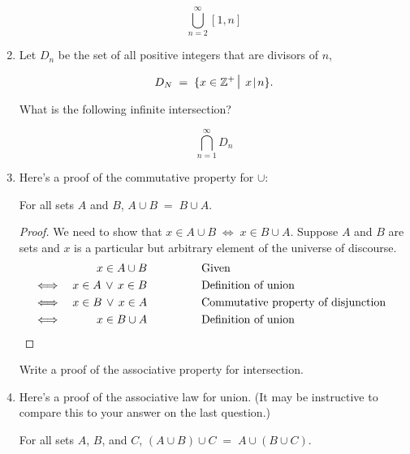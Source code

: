 \documentclass{amsart}
\begin{document}
\begin{enumerate}
\[ \bigcup_{n=2}^{\infty} [1, n] \]

\vfill

\item Let $D_n$ be the set of all positive integers that are divisors of $n$,

\[ D_N \; = \; \{ x \in \Integers^+ \suchthat \; x \divides n \}. \]

\noindent What is the following infinite intersection?

\[ \bigcap_{n=1}^{\infty} D_n \]

\vfill

\newpage

\item Here's a proof of the commutative property for $\cup$:

\begin{thm*}
For all sets $A$ and $B$, $A \cup B \; = \; B \cup A$.
\end{thm*}

\begin{proof}
We need to show that $x \in A \cup B \; \iff \; x \in B \cup A$.  Suppose $A$ and $B$ are sets and $x$ is a particular but arbitrary element of
the universe of discourse.
\begin{align*}
 &      & x \in A \cup B \rule{48pt}{0pt} & \mbox{Given} & \\
 & \iff & x \in A \, \lor \, x \in B \rule{48pt}{0pt}  & \mbox{Definition of union} & \\
 & \iff & x \in B \, \lor \, x \in A \rule{48pt}{0pt}  & \mbox{Commutative property of disjunction} & \\
 & \iff & x \in B \cup A \rule{48pt}{0pt}  & \mbox{Definition of union} & 
\end{align*}
\end{proof}

Write a proof of the associative property for intersection.

\vfill

\vfill

\newpage

\item Here's a proof of the associative law for union. (It may be instructive to compare this to your answer on the last question.)

\begin{thm*}
For all sets $A$, $B$, and $C$, $(A \cup B) \cup C \; = \; A \cup (B \cup C)$.
\end{thm*}


\end{enumerate}
\end{document}
